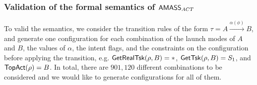 
\subsubsection{Validation of the formal semantics of $\textsf{AMASS}_{ACT}$}
%
To valid the semantics, we consider the transition rules of the form $\tau = A\xrightarrow{\alpha(\phi)} B$, and generate one configuration for each combination of the launch modes of $A$ and $B$, the values of $\alpha$, the intent flags, and the constraints on the configuration before applying the transition, e.g. $\mathsf{GetRealTsk}(\rho, B) = *$, $\mathsf{GetTsk}(\rho, B) = S_1$, and $\mathsf{TopAct}(\rho) = B$. 
In total, there are $901,120$ different combinations to be considered and we would like to generate configurations for all of them.


